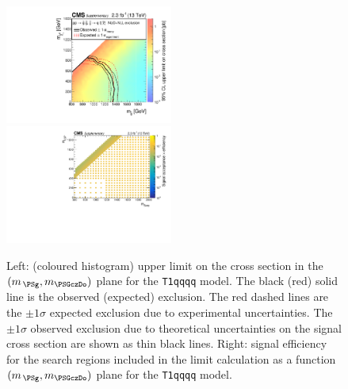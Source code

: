\clearpage
\begin{figure}[!h]
  \begin{center}
    \includegraphics[width=0.49\textwidth]{RA1T1qqqqXSEC_aux} \, 
    \includegraphics[width=0.49\textwidth]{T1qqqq_merging_4_cats_aux} \,     
  \end{center}
  \caption{Left: (coloured histogram) upper limit on the cross section in the $(m_{\,\PSg}, m_{\PSGczDo})$ plane for the \texttt{T1qqqq} model. 
  The black (red) solid line is the observed (expected) exclusion. The red dashed lines are the $\pm1\sigma$ expected exclusion due to experimental uncertainties. 
  The $\pm1\sigma$ observed exclusion due to theoretical uncertainties on the signal cross section are shown as thin black lines. 
  Right: signal efficiency for the search regions included in the limit calculation as a function $(m_{\,\PSg}, m_{\PSGczDo})$ plane for the \texttt{T1qqqq} model. 
  \label{fig:T1qqqq_excl}}
\end{figure}


